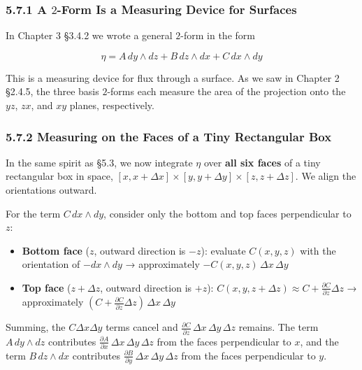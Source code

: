 \hypertarget{a-2-form-is-a-measuring-device-for-surfaces}{%
\subsubsection{\texorpdfstring{5.7.1 A \(2\)-Form Is a Measuring Device
for
Surfaces}{5.7.1 A 2-Form Is a Measuring Device for Surfaces}}\label{a-2-form-is-a-measuring-device-for-surfaces}}

In Chapter 3 §3.4.2 we wrote a general \(2\)-form in the form

\[\eta = A\,dy \wedge dz + B\,dz \wedge dx + C\,dx \wedge dy\]

This is a measuring device for flux through a surface. As we saw in
Chapter 2 §2.4.5, the three basis \(2\)-forms each measure the area of
the projection onto the \(yz\), \(zx\), and \(xy\) planes, respectively.

\hypertarget{measuring-on-the-faces-of-a-tiny-rectangular-box}{%
\subsubsection{5.7.2 Measuring on the Faces of a Tiny Rectangular
Box}\label{measuring-on-the-faces-of-a-tiny-rectangular-box}}

In the same spirit as §5.3, we now integrate \(\eta\) over
\textbf{all six faces} of a tiny rectangular box in space,
\([x, x+\Delta x] \times [y, y+\Delta y] \times [z, z+\Delta z]\). We
align the orientations outward.

For the term \(C\,dx \wedge dy\), consider only the bottom and top faces
perpendicular to \(z\):

\begin{itemize}
\item
  \textbf{Bottom face} (\(z\), outward direction is \(-z\)): evaluate
  \(C(x,y,z)\) with the orientation of \(-dx \wedge dy\) → approximately
  \(-C(x,y,z)\,\Delta x\,\Delta y\)
\item
  \textbf{Top face} (\(z+\Delta z\), outward direction is \(+z\)):
  \(C(x,y,z+\Delta z) \approx C + \frac{\partial C}{\partial z}\Delta z\)
  → approximately
  \((C + \frac{\partial C}{\partial z}\Delta z)\,\Delta x\,\Delta y\)
\end{itemize}

Summing, the \(C\Delta x\Delta y\) terms cancel and
\(\frac{\partial C}{\partial z}\,\Delta x\,\Delta y\,\Delta z\) remains.
The term \(A\,dy \wedge dz\) contributes
\(\frac{\partial A}{\partial x}\,\Delta x\,\Delta y\,\Delta z\) from the
faces perpendicular to \(x\), and the term \(B\,dz \wedge dx\)
contributes
\(\frac{\partial B}{\partial y}\,\Delta x\,\Delta y\,\Delta z\) from the
faces perpendicular to \(y\).

